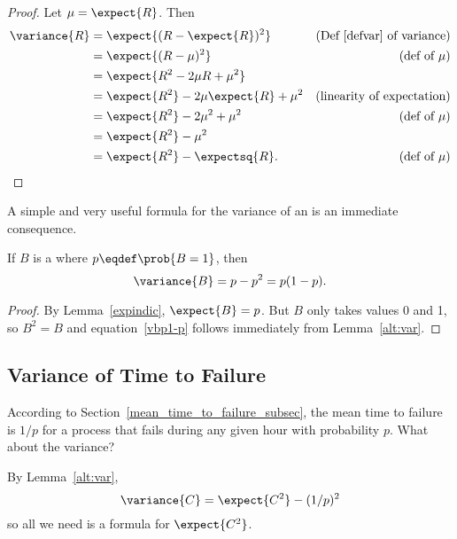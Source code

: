 \begin{proof}
Let $\mu = \expect{R}$.  Then
\begin{align*}
\variance{R} & =   \expect{(R - \expect{R})^2}
               & \text{(Def~\ref{defvar} of variance)}\\
        & = \expect{(R - \mu)^2} & \text{(def of $\mu$)}\\
        & = \expect{R^2 - 2  \mu R + \mu^2} \\
        & = \expect{R^2} - 2 \mu \expect{R} + \mu^2 
                & \text{(linearity of expectation)}\\
        & = \expect{R^2} - 2 \mu^2 + \mu^2
              &  \text{(def of $\mu$)}\\
        & = \expect{R^2} - \mu^2\\
        & = \expect{R^2} - \expectsq{R}.
                  &  \text{(def of $\mu$)}
\end{align*}
\end{proof}

A simple and very useful formula for the variance of an  is an immediate consequence.
\begin{corollary}\label{bernoulli-variance}
If $B$ is a  where $p\eqdef
\prob{B=1}$, then
\begin{equation}\label{vbp1-p}
\variance{B} = p-p^2 = p(1-p).
\end{equation}
\begin{proof}
  By Lemma~\ref{expindic}, $\expect{B}= p$.  But $B$ only takes
  values 0 and 1, so $B^2 = B$ and equation~\eqref{vbp1-p} follows
  immediately from Lemma~\ref{alt:var}.
\end{proof}

\end{corollary}

\subsection{Variance of Time to Failure}
According to Section~\ref{mean_time_to_failure_subsec}, the mean time
to failure is $1/p$ for a process that fails during any given hour
with probability $p$.  What about the variance?

By Lemma~\ref{alt:var},
\begin{equation}\label{varCEC2}
\variance{C} = \expect{C^2} - (1/p)^2
\end{equation}
so all we need is a formula for $\expect{C^2}$.

\iffalse

